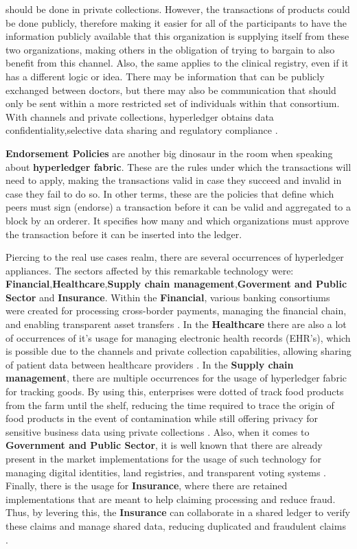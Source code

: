 should be done in private collections. However, the transactions of products could be done publicly, therefore making it easier for all 
of the participants to have the information publicly available that this organization is supplying itself from these two organizations, 
making others in the obligation of trying to bargain to also benefit from this channel. Also, the same applies to the clinical registry, 
even if it has a different logic or idea. There may be information that can be publicly exchanged between doctors, but there may also 
be communication that should only be sent within a more restricted set of individuals within that consortium. With channels and private 
collections, hyperledger obtains data confidentiality,selective data sharing and regulatory compliance \cite{private-collections}. 

\textbf{Endorsement Policies} are another big dinosaur in the room when speaking about \textbf{hyperledger fabric}. These are the 
rules under which the transactions will need to apply, making the transactions valid in case they succeed and invalid in case they 
fail to do so. In other terms, these are the policies that define which peers must sign (endorse) a transaction before it can be valid 
and aggregated to a block by an orderer. It specifies how many and which organizations must approve the transaction before it can be 
inserted into the ledger.

Piercing to the real use cases realm, there are several occurrences of hyperledger appliances. The sectors affected by this remarkable 
technology were: \textbf{Financial},\textbf{Healthcare},\textbf{Supply chain management},\textbf{Goverment and Public Sector} and 
\textbf{Insurance}. Within the \textbf{Financial}, various banking consortiums were created for processing cross-border payments, managing 
the financial chain, and enabling transparent asset transfers \cite{finances-use-case}. In the \textbf{Healthcare} there are also a 
lot of occurrences of it's usage for managing electronic health records (EHR's), which is possible due to the channels and private 
collection capabilities, allowing sharing of patient data between healthcare providers \cite{healthcare-use-case}. In the 
\textbf{Supply chain management}, there are multiple occurrences for the usage of hyperledger fabric for tracking goods. By using 
this, enterprises were dotted of track food products from the farm until the shelf, reducing the time required to trace the origin of 
food products in the event of contamination while still offering privacy for sensitive business data using private collections 
\cite{supply-chain-use-case}. Also, when it comes to \textbf{Government and Public Sector}, it is well known that there are already 
present in the market implementations for the usage of such technology for managing digital identities, land registries, and transparent 
voting systems \cite{public-sector-use-case}. Finally, there is the usage for \textbf{Insurance}, where there are retained implementations 
that are meant to help claiming processing and reduce fraud. Thus, by levering this, the \textbf{Insurance} can collaborate in a 
shared ledger to verify these claims and manage shared data, reducing duplicated and fraudulent claims \cite{insurance-use-case}.

